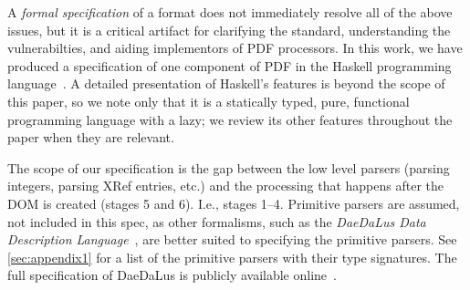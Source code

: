 
A \emph{formal specification} of a format does not immediately resolve
all of the above issues, but it is a critical artifact for clarifying
the standard, understanding the vulnerabilties, and aiding
implementors of PDF processors.
%
In this work, we have produced a specification of one component of PDF
in the Haskell programming language~\cite{jones2003haskell}.
%
A detailed presentation of Haskell's features is beyond the scope of
this paper, so we note only that it is a statically typed, pure,
functional programming language with a lazy;
%
we review its other features throughout the paper when they are
relevant.

The scope of our specification is the gap between the low level
parsers (parsing integers, parsing XRef entries, etc.) and the
processing that happens after the DOM is created (stages 5 and 6).
%
I.e., stages 1--4.
%
Primitive parsers are assumed, not included in this spec, as other
formalisms, such as the \emph{DaeDaLus Data Description
  Language}~\cite{daedalusrepo}, are better suited to specifying the
primitive parsers.
%
See \cref{sec:appendix1} for a list of the primitive parsers
with their type signatures.
%
The full specification of DaeDaLus is publicly available
online~\cite{daedalusrepo}.

